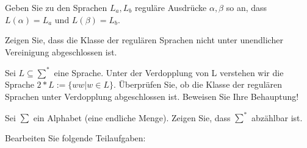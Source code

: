 \documentclass[10pt, a4paper]{exam}
\begin{document}
\begin{questions}
    \question Geben Sie zu den Sprachen $L_a,L_b$ reguläre Ausdrücke $\alpha,\beta$ so an, dass $L(\alpha) = L_a$ und $L(\beta) = L_b$.

    \question Zeigen Sie, dass die Klasse der regulären Sprachen nicht unter unendlicher Vereinigung abgeschlossen ist.
    \begin{solution}
    \end{solution}

    \question Sei $L\subseteq\sum^*$ eine Sprache. Unter der Verdopplung von L verstehen wir die Sprache $2*L:= \{ww \vert w \in L\}$. Überprüfen Sie, ob die Klasse der regulären Sprachen unter Verdopplung abgeschlossen ist. Beweisen Sie Ihre Behauptung!
    \begin{solution}
    \end{solution}

    \question Sei $\sum$ ein Alphabet (eine endliche Menge). Zeigen Sie, dass $\sum^*$ abzählbar ist.
    \begin{solution}
    \end{solution}

    \question Bearbeiten Sie folgende Teilaufgaben:
\end{questions}
\end{document}
